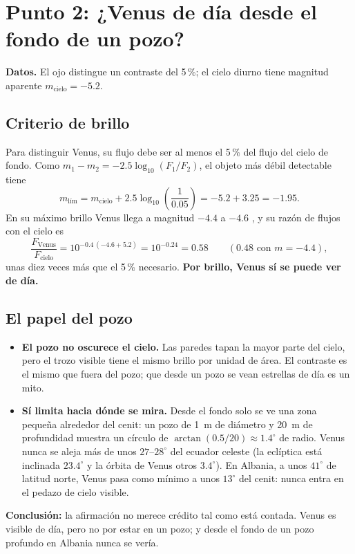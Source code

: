 \documentclass[11pt,a4paper]{article}
\begin{document}
\section{Punto 2: ¿Venus de día desde el fondo de un pozo?}

\textbf{Datos.} El ojo distingue un contraste del 5\,\%; el cielo diurno tiene magnitud aparente
$m_\text{cielo} = -5.2$.

\subsection{Criterio de brillo}
Para distinguir Venus, su flujo debe ser al menos el 5\,\% del flujo del cielo de fondo. Como
$m_1 - m_2 = -2.5\log_{10}(F_1/F_2)$, el objeto más débil detectable tiene
\begin{equation}
m_\text{lím} = m_\text{cielo} + 2.5\log_{10}\!\left(\frac{1}{0.05}\right) = -5.2 + 3.25 = -1.95 .
\end{equation}
En su máximo brillo Venus llega a magnitud $-4.4$ a $-4.6$ \cite{naoj,earthsky}, y su razón de flujos
con el cielo es
\begin{equation}
\frac{F_\text{Venus}}{F_\text{cielo}} = 10^{-0.4\,(-4.6+5.2)} = 10^{-0.24} = 0.58
\qquad (0.48 \text{ con } m = -4.4),
\end{equation}
unas diez veces más que el 5\,\% necesario. \textbf{Por brillo, Venus sí se puede ver de día.}

\subsection{El papel del pozo}
\begin{itemize}
  \item \textbf{El pozo no oscurece el cielo.} Las paredes tapan la mayor parte del cielo, pero el
  trozo visible tiene el mismo brillo por unidad de área. El contraste es el mismo que fuera del
  pozo; que desde un pozo se vean estrellas de día es un mito.
  \item \textbf{Sí limita hacia dónde se mira.} Desde el fondo solo se ve una zona pequeña alrededor
  del cenit: un pozo de \SI{1}{m} de diámetro y \SI{20}{m} de profundidad muestra un círculo de
  $\arctan(0.5/20) \approx 1.4^\circ$ de radio. Venus nunca se aleja más de unos $27$--$28^\circ$ del
  ecuador celeste (la eclíptica está inclinada $23.4^\circ$ y la órbita de Venus otros $3.4^\circ$).
  En Albania, a unos $41^\circ$ de latitud norte, Venus pasa como mínimo a unos $13^\circ$ del cenit:
  nunca entra en el pedazo de cielo visible.
\end{itemize}
\textbf{Conclusión:} la afirmación no merece crédito tal como está contada. Venus es visible de día,
pero no por estar en un pozo; y desde el fondo de un pozo profundo en Albania nunca se vería.
\end{document}
